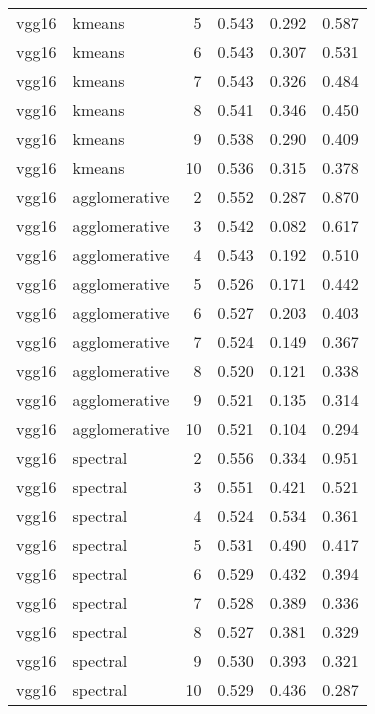 \begin{longtable}{llrrrr}
      vgg16 &        kmeans &  5 &            0.543 &   0.292 &    0.587 \\
      vgg16 &        kmeans &  6 &            0.543 &   0.307 &    0.531 \\
      vgg16 &        kmeans &  7 &            0.543 &   0.326 &    0.484 \\
      vgg16 &        kmeans &  8 &            0.541 &   0.346 &    0.450 \\
      vgg16 &        kmeans &  9 &            0.538 &   0.290 &    0.409 \\
      vgg16 &        kmeans & 10 &            0.536 &   0.315 &    0.378 \\
      vgg16 & agglomerative &  2 &            0.552 &   0.287 &    0.870 \\
      vgg16 & agglomerative &  3 &            0.542 &   0.082 &    0.617 \\
      vgg16 & agglomerative &  4 &            0.543 &   0.192 &    0.510 \\
      vgg16 & agglomerative &  5 &            0.526 &   0.171 &    0.442 \\
      vgg16 & agglomerative &  6 &            0.527 &   0.203 &    0.403 \\
      vgg16 & agglomerative &  7 &            0.524 &   0.149 &    0.367 \\
      vgg16 & agglomerative &  8 &            0.520 &   0.121 &    0.338 \\
      vgg16 & agglomerative &  9 &            0.521 &   0.135 &    0.314 \\
      vgg16 & agglomerative & 10 &            0.521 &   0.104 &    0.294 \\
      vgg16 &      spectral &  2 &            0.556 &   0.334 &    0.951 \\
      vgg16 &      spectral &  3 &            0.551 &   0.421 &    0.521 \\
      vgg16 &      spectral &  4 &            0.524 &   0.534 &    0.361 \\
      vgg16 &      spectral &  5 &            0.531 &   0.490 &    0.417 \\
      vgg16 &      spectral &  6 &            0.529 &   0.432 &    0.394 \\
      vgg16 &      spectral &  7 &            0.528 &   0.389 &    0.336 \\
      vgg16 &      spectral &  8 &            0.527 &   0.381 &    0.329 \\
      vgg16 &      spectral &  9 &            0.530 &   0.393 &    0.321 \\
      vgg16 &      spectral & 10 &            0.529 &   0.436 &    0.287 \\
\end{longtable}

